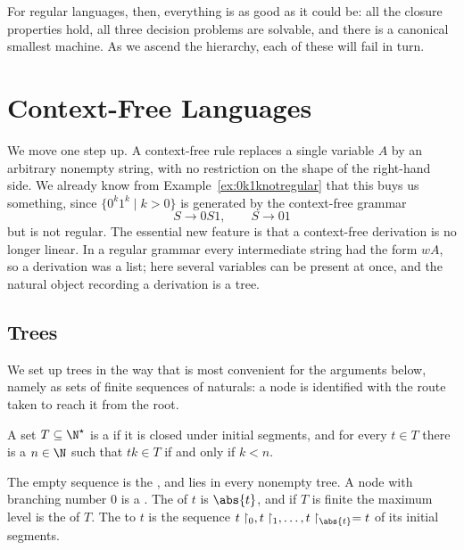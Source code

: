 For regular languages, then, everything is as good as it could be: all the closure properties hold, all three decision problems are solvable, and there is a canonical smallest machine. As we ascend the hierarchy, each of these will fail in turn.

\section{Context-Free Languages}\label{sec:cfl}

We move one step up. A context-free rule replaces a single variable $A$ by an arbitrary nonempty string, with no restriction on the shape of the right-hand side. We already know from Example~\ref{ex:0k1knotregular} that this buys us something, since $\{0^k1^k \mid k > 0\}$ is generated by the context-free grammar
$$S \to 0S1, \qquad S \to 01$$
but is not regular. The essential new feature is that a context-free derivation is no longer linear. In a regular grammar every intermediate string had the form $wA$, so a derivation was a list; here several variables can be present at once, and the natural object recording a derivation is a tree.

\subsection{Trees}

We set up trees in the way that is most convenient for the arguments below, namely as sets of finite sequences of naturals: a node is identified with the route taken to reach it from the root.

\begin{definition}[Tree]
	A set $T \subseteq \N^\star$ is a  if it is closed under initial segments, and for every $t \in T$ there is a  $n \in \N$ such that $tk \in T$ if and only if $k < n$.

	The empty sequence is the , and lies in every nonempty tree. A node with branching number $0$ is a . The  of $t$ is $\abs{t}$, and if $T$ is finite the maximum level is the  of $T$. The  to $t$ is the sequence $t\restriction_0, t\restriction_1, \dots, t\restriction_{\abs{t}} = t$ of its initial segments.
\end{definition}

